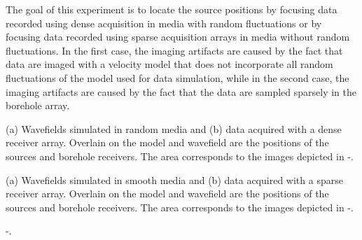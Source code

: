 The goal of this experiment is to locate the source positions by
focusing data recorded using dense acquisition in media with random
fluctuations or by focusing data recorded using sparse acquisition
arrays in media without random fluctuations. In the first case, the
imaging artifacts are caused by the fact that data are imaged with a
velocity model that does not incorporate all random fluctuations of
the model used for data simulation, while in the second case, the
imaging artifacts are caused by the fact that the data are sampled
sparsely in the borehole array. 


 {(a) Wavefields
  simulated in random media and (b) data acquired with a dense
  receiver array. Overlain on the model and wavefield are the
  positions of the sources and borehole receivers. The 
   area corresponds to the images depicted in
  -.}

 {(a) Wavefields
  simulated in smooth media and (b) data acquired with a sparse
  receiver array. Overlain on the model and wavefield are the
  positions of the sources and borehole receivers. The 
   area corresponds to the images depicted in
  -.}

 {
  -. }

